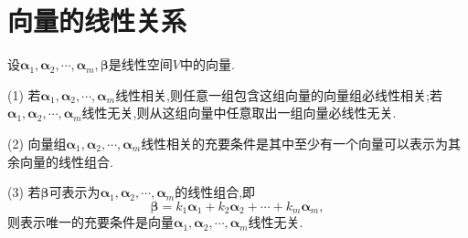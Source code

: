 \documentclass[../../main.tex]{subfiles}%
\begin{document}
\section{向量的线性关系}

\begin{theorem}\label{theorem:向量的线性关系定理1}
设\(\boldsymbol{\alpha}_1,\boldsymbol{\alpha}_2,\cdots,\boldsymbol{\alpha}_m,\boldsymbol{\beta}\)是线性空间\(V\)中的向量.

(1) 若\(\boldsymbol{\alpha}_1,\boldsymbol{\alpha}_2,\cdots,\boldsymbol{\alpha}_m\)线性相关,则任意一组包含这组向量的向量组必线性相关;若\(\boldsymbol{\alpha}_1,\boldsymbol{\alpha}_2,\cdots,\boldsymbol{\alpha}_m\)线性无关,则从这组向量中任意取出一组向量必线性无关.

(2) 向量组\(\boldsymbol{\alpha}_1,\boldsymbol{\alpha}_2,\cdots,\boldsymbol{\alpha}_m\)线性相关的充要条件是其中至少有一个向量可以表示为其余向量的线性组合.

(3) 若\(\boldsymbol{\beta}\)可表示为\(\boldsymbol{\alpha}_1,\boldsymbol{\alpha}_2,\cdots,\boldsymbol{\alpha}_m\)的线性组合,即
\[
\boldsymbol{\beta}=k_1\boldsymbol{\alpha}_1 + k_2\boldsymbol{\alpha}_2+\cdots + k_m\boldsymbol{\alpha}_m,
\]
则表示唯一的充要条件是向量\(\boldsymbol{\alpha}_1,\boldsymbol{\alpha}_2,\cdots,\boldsymbol{\alpha}_m\)线性无关.
\end{theorem}
\end{document}
